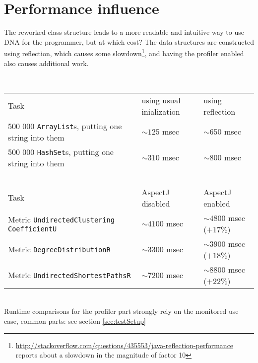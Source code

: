 \section{Performance influence}
	The reworked class structure leads to a more readable and intuitive way to use DNA for
	the programmer, but at which cost? The data structures are constructed using reflection,
	which causes some
	slowdown\footnote{\url{http://stackoverflow.com/questions/435553/java-reflection-performance}
	reports about a slowdown in the magnitude of factor 10}, and having the profiler
	enabled also causes additional work. 
	
	\ \\ 	
	\centering
	\begin{tabular}{lll}
		Task & using usual inialization & using reflection \\
	    500 000 \texttt{ArrayList}s, putting one string into them & 
	    	$\sim 125$ msec & $\sim 650$ msec   \\
	    500 000 \texttt{HashSet}s, putting one string into them  &
	    	$\sim 310$ msec & $\sim 800$ msec \\
		~ & ~ & \\
		Task & AspectJ disabled & AspectJ enabled \\
    	Metric \texttt{Undirected\allowbreak Clustering\allowbreak
			CoefficientU} & $\sim 4100$ msec & $\sim 4800$ msec ($+ 17\%$) \\
		Metric \texttt{Degree\allowbreak DistributionR} &
			$\sim 3300$ msec & $\sim 3900$ msec ($+ 18\%$) \\
		Metric \texttt{Undirected\allowbreak Shortest\allowbreak PathsR} &
			$\sim 7200$ msec & $\sim 8800$ msec ($+ 22\%$) \\
    \end{tabular}
    
	\ \\
	Runtime comparisons for the profiler part strongly rely on the monitored use
	case, common parts: see section \ref{sec:testSetup}
